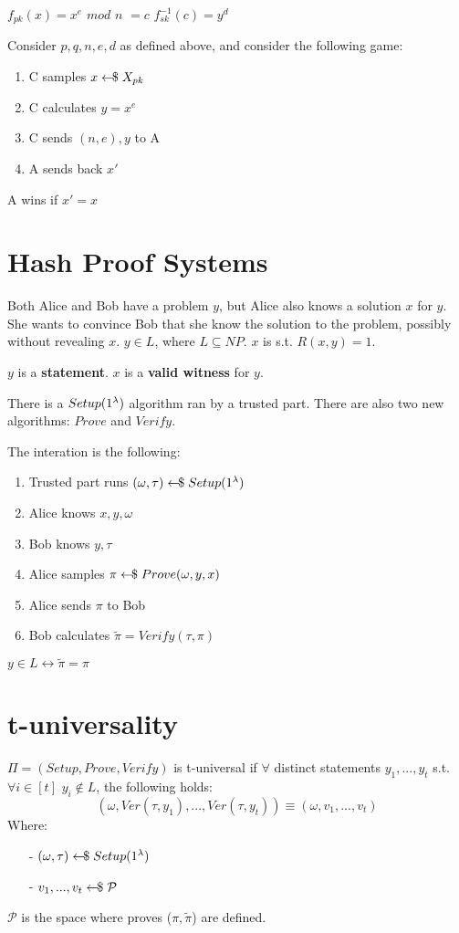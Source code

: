 $f_{pk}(x) = x^e$ $mod$ $n$ $=c$\newline
$f_{sk}^{-1}(c) = y^d$ \modn

Consider $p,q,n,e,d$ as defined above, and consider the following game:
\begin{enumerate}
    \item C samples $x \leftarrow\kern-0.42em{\$} \; X_{pk}$
    \item C calculates $y = x^e$ \modn
    \item C sends $(n,e), y$ to A
    \item A sends back $x'$
\end{enumerate}
A wins if $x' = x$


\section{Hash Proof Systems}
Both Alice and Bob have a problem $y$, but Alice also knows a solution $x$ for $y$. She wants to convince Bob that she know the solution to the problem, possibly without revealing $x$.\newline
$y \in L$, where $L \subseteq NP$. $x$ is s.t. $R(x,y) = 1$.

$y$ is a \textbf{statement}.\newline
$x$ is a \textbf{valid witness} for $y$.

There is a $Setup(1^\lambda)$ algorithm ran by a trusted part.\newline
There are also two new algorithms: $Prove$ and $Verify$.

The interation is the following:
\begin{enumerate}
    \item Trusted part runs $(\omega, \tau) \leftarrow\kern-0.42em{\$} \; Setup(1^\lambda)$
    \item Alice knows $x,y,\omega$
    \item Bob knows $y,\tau$
    \item Alice samples $\pi \leftarrow\kern-0.42em{\$} \; Prove(\omega,y,x)$
    \item Alice sends $\pi$ to Bob
    \item Bob calculates $\tilde{\pi} = Verify(\tau,\pi)$
\end{enumerate}
$y \in L  \leftrightarrow \tilde{\pi} = \pi$
\newpage


\section{t-universality}
$\Pi = (Setup, Prove, Verify)$ is t-universal if $\forall$ distinct statements $y_1, ..., y_t$ s.t. $\forall i \in [t]$ $y_i \not\in L$, the following holds:
\[ (\omega, Ver(\tau,y_1), ..., Ver(\tau,y_t)) \equiv (\omega, v_1, ..., v_t) \]
Where:
\begin{itemize}
    \item[-] $(\omega,\tau) \leftarrow\kern-0.42em{\$} \; Setup(1^\lambda)$
    \item[-] $v_1, ..., v_t \leftarrow\kern-0.42em{\$} \; \mathcal{P}$
\end{itemize}
$\mathcal{P}$ is the space where proves ($\pi, \tilde{\pi}$) are defined.


